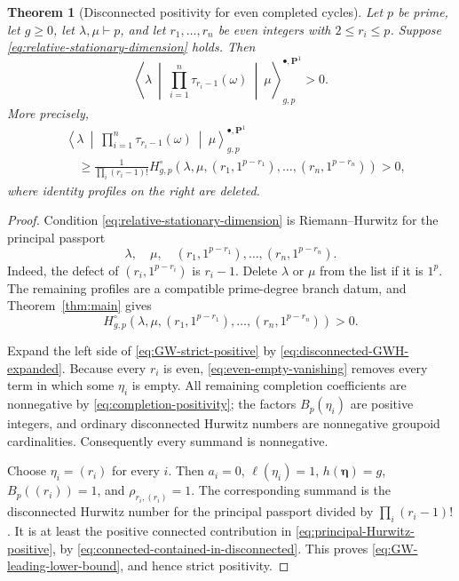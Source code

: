 \documentclass[10pt,a4paper]{amsart}
\newtheorem{theorem}{Theorem}[section]
\numberwithin{equation}{section}
\begin{document}
\begin{theorem}[Disconnected positivity for even completed cycles]
\label{thm:GW-positive-sector}
Let $p$ be prime, let $g\geq0$, let $\lambda,\mu\vdash p$, and let
$r_1,\ldots,r_n$ be even integers with $2\leq r_i\leq p$.  Suppose
\eqref{eq:relative-stationary-dimension} holds.  Then
\begin{equation}\label{eq:GW-strict-positive}
 \left\langle\lambda\ \middle|\
   \prod_{i=1}^n\tau_{r_i-1}(\omega)\
   \middle|\ \mu\right\rangle^{\bullet,\mathbf P^1}_{g,p}>0.
\end{equation}
More precisely,
\begin{align}
&\left\langle\lambda\ \middle|\
   \prod_{i=1}^n\tau_{r_i-1}(\omega)\
   \middle|\ \mu\right\rangle^{\bullet,\mathbf P^1}_{g,p}
\label{eq:GW-leading-lower-bound}\\
&\quad\geq
 \frac1{\prod_i(r_i-1)!}
 H^\circ_{g,p}
 \left(\lambda,\mu,
 (r_1,1^{p-r_1}),\ldots,(r_n,1^{p-r_n})\right)>0,
\nonumber
\end{align}
where identity profiles on the right are deleted.
\end{theorem}

\begin{proof}
Condition \eqref{eq:relative-stationary-dimension} is Riemann--Hurwitz for
the principal passport
\begin{equation}\label{eq:principal-GW-passport}
 \lambda,\quad\mu,\quad
 (r_1,1^{p-r_1}),\ldots,(r_n,1^{p-r_n}).
\end{equation}
Indeed, the defect of $(r_i,1^{p-r_i})$ is $r_i-1$.  Delete $\lambda$ or
$\mu$ from the list if it is $1^p$.  The remaining profiles are a compatible
prime-degree branch datum, and Theorem~\ref{thm:main} gives
\begin{equation}\label{eq:principal-Hurwitz-positive}
 H^\circ_{g,p}
 \left(\lambda,\mu,
 (r_1,1^{p-r_1}),\ldots,(r_n,1^{p-r_n})\right)>0.
\end{equation}

Expand the left side of \eqref{eq:GW-strict-positive} by
\eqref{eq:disconnected-GWH-expanded}.  Because every $r_i$ is even,
\eqref{eq:even-empty-vanishing} removes every term in which some
$\eta_i$ is empty.  All remaining completion coefficients are nonnegative
by \eqref{eq:completion-positivity}; the factors $B_p(\eta_i)$ are positive
integers, and ordinary disconnected Hurwitz numbers are nonnegative
groupoid cardinalities.  Consequently every summand is nonnegative.

Choose $\eta_i=(r_i)$ for every $i$.  Then $a_i=0$,
$\ell(\eta_i)=1$, $h(\boldsymbol\eta)=g$,
$B_p((r_i))=1$, and $\rho_{r_i,(r_i)}=1$.  The corresponding summand is the
disconnected Hurwitz number for the principal passport divided by
$\prod_i(r_i-1)!$.  It is at least the positive connected contribution in
\eqref{eq:principal-Hurwitz-positive}, by
\eqref{eq:connected-contained-in-disconnected}.  This proves
\eqref{eq:GW-leading-lower-bound}, and hence strict positivity.
\end{proof}
\end{document}
